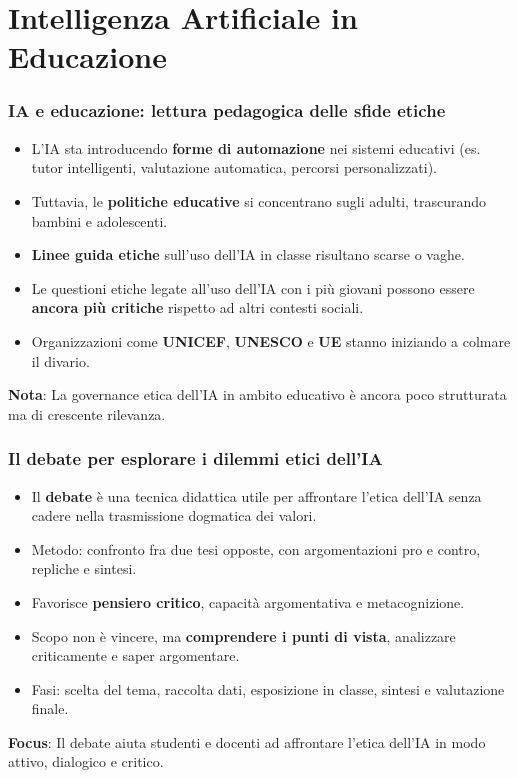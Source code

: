 \documentclass{beamer}
\begin{document}
\section{Intelligenza Artificiale in Educazione}
%
%
\begin{frame}
\frametitle{IA e educazione: lettura pedagogica delle sfide etiche}

\begin{itemize}
    \item L’IA sta introducendo \textbf{forme di automazione} nei sistemi educativi (es. tutor intelligenti, valutazione automatica, percorsi personalizzati).
    \item Tuttavia, le \textbf{politiche educative} si concentrano sugli adulti, trascurando bambini e adolescenti.
    \item \textbf{Linee guida etiche} sull’uso dell’IA in classe risultano scarse o vaghe.
    \item Le questioni etiche legate all’uso dell’IA con i più giovani possono essere \textbf{ancora più critiche} rispetto ad altri contesti sociali.
    \item Organizzazioni come \textbf{UNICEF}, \textbf{UNESCO} e \textbf{UE} stanno iniziando a colmare il divario.
\end{itemize}

\vspace{0.3cm}
{\small
\textbf{Nota}: La governance etica dell’IA in ambito educativo è ancora poco strutturata ma di crescente rilevanza.
}

\end{frame}
%
%
\begin{frame}
\frametitle{Il debate per esplorare i dilemmi etici dell’IA}

\begin{itemize}
    \item Il \textbf{debate} è una tecnica didattica utile per affrontare l’etica dell’IA senza cadere nella trasmissione dogmatica dei valori.
    \item Metodo: confronto fra due tesi opposte, con argomentazioni pro e contro, repliche e sintesi.
    \item Favorisce \textbf{pensiero critico}, capacità argomentativa e metacognizione.
    \item Scopo non è vincere, ma \textbf{comprendere i punti di vista}, analizzare criticamente e saper argomentare.
    \item Fasi: scelta del tema, raccolta dati, esposizione in classe, sintesi e valutazione finale.
\end{itemize}

\vspace{0.3cm}
{\small
\textbf{Focus}: Il debate aiuta studenti e docenti ad affrontare l’etica dell’IA in modo attivo, dialogico e critico.
}
\end{frame}
%
\end{document}
